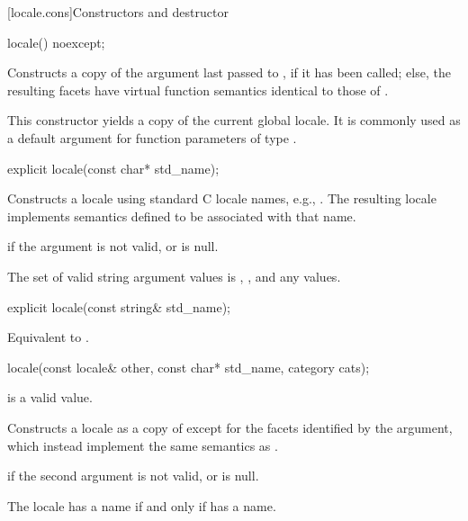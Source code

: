 [locale.cons]{Constructors and destructor}

%
\begin{itemdecl}
locale() noexcept;
\end{itemdecl}

\begin{itemdescr}
\pnum
\effects
Constructs a copy of the argument last passed to
,
if it has been called;
else, the resulting facets have virtual function semantics identical to
those of .
\begin{note}
This constructor yields a copy of the current global locale.
It is commonly used as a default argument for
function parameters of type .
\end{note}
\end{itemdescr}

%
\begin{itemdecl}
explicit locale(const char* std_name);
\end{itemdecl}

\begin{itemdescr}
\pnum
\effects
Constructs a locale using standard C locale names, e.g., .
The resulting locale implements semantics defined to be associated
with that name.

\pnum
\throws
{} if the argument is not valid, or is null.

\pnum
\remarks
The set of valid string argument values is
, , and any  values.
\end{itemdescr}

%
\begin{itemdecl}
explicit locale(const string& std_name);
\end{itemdecl}

\begin{itemdescr}
\pnum
\effects
Equivalent to .
\end{itemdescr}

%
\begin{itemdecl}
locale(const locale& other, const char* std_name, category cats);
\end{itemdecl}

\begin{itemdescr}
\pnum
\expects
{} is a valid  value.

\pnum
\effects
Constructs a locale as a copy of 
except for the facets identified by the  argument,
which instead implement the same semantics as .

\pnum
\throws
{} if the second argument is not valid, or is null.

\pnum
\remarks
The locale has a name if and only if  has a name.
\end{itemdescr}

